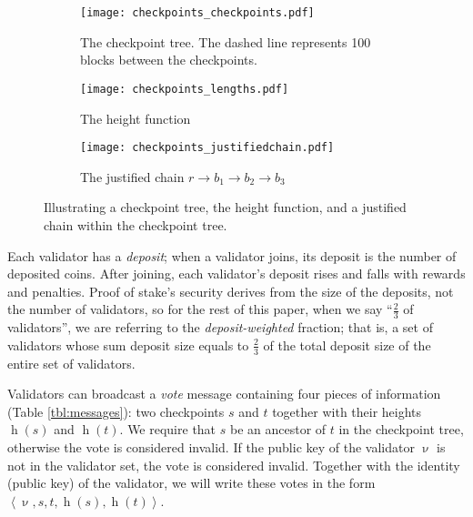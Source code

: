 \documentclass[12pt]{article}
\newcommand{\h}{\operatorname{h}\xspace}
\begin{document}
\begin{figure}[htb]
\centering
   \begin{subfigure}[b]{0.90\textwidth}
   \centering
   \texttt{[image: checkpoints\_checkpoints.pdf]}
	\caption{The checkpoint tree.  The dashed line represents 100 blocks between the checkpoints.}
	\label{fig:2a}	
	\end{subfigure}
	\vspace{0.2in}
	
\begin{subfigure}[b]{0.45\textwidth}
   \centering
   \texttt{[image: checkpoints\_lengths.pdf]}
	\caption{The height function}
	\label{fig:2b}	
	\end{subfigure} \hspace{0.05\textwidth} 	 \begin{subfigure}[b]{0.45\textwidth}
   \centering
   \texttt{[image: checkpoints\_justifiedchain.pdf]}
	\caption{The justified chain $r \to b_1 \to b_2 \to b_3$}
	\label{fig:2c}	
	\end{subfigure}

\caption{Illustrating a checkpoint tree, the height function, and a justified chain within the checkpoint tree.}
\label{fig:conflicting_checkpoints}
\end{figure}



Each validator has a \emph{deposit}; when a validator joins, its deposit is the number of deposited coins.  After joining, each validator's deposit rises and falls with rewards and penalties.  Proof of stake's security derives from the size of the deposits, not the number of validators, so for the rest of this paper, when we say ``$\frac{2}{3}$ of validators'', we are referring to the \emph{deposit-weighted} fraction; that is, a set of validators whose sum deposit size equals to $\frac{2}{3}$ of the total deposit size of the entire set of validators.

Validators can broadcast a \textit{vote} message containing four pieces of information (Table \ref{tbl:messages}): two checkpoints $s$ and $t$ together with their heights $\h(s)$ and $\h(t)$.  We require that $s$ be an ancestor of $t$ in the checkpoint tree, otherwise the vote is considered invalid.  If the public key of the validator $\upnu$ is not in the validator set, the vote is considered invalid.  Together with the identity (public key) of the validator, we will write these votes in the form $\left\langle \upnu, s, t, \h(s), \h(t) \right\rangle$.
\end{document}
